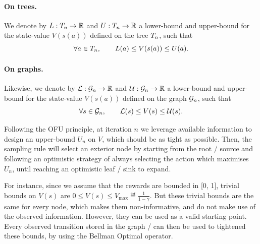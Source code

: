 \documentclass[runningheads]{llncs}
\begin{document}
\begin{definition}
\paragraph{On trees.} We denote by $L:T_n \rightarrow \mathbb{R}$ and  $U:T_n \rightarrow \mathbb{R}$ a lower-bound and upper-bound for the state-value $V(s(a))$ defined on the tree $T_n$, such that
\begin{equation*}
    \forall a\in T_n, \qquad L(a) \leq V(s(a)) \leq U(a).
\end{equation*}

\paragraph{On graphs.} Likewise, we denote by $\mathcal{L}:\mathcal{G}_n \rightarrow \mathbb{R}$ and  $\mathcal{U}:\mathcal{G}_n \rightarrow \mathbb{R}$ a lower-bound and upper-bound for the state-value $V(s(a))$ defined on the graph $\mathcal{G}_n$, such that
\begin{equation*}
\forall s\in\mathcal{G}_n, \qquad \mathcal{L}(s) \leq V(s) \leq \mathcal{U}(s).
\end{equation*}
\end{definition}

Following the OFU principle, at iteration $n$ we leverage available information to design an upper-bound $U_n$ on $V$, which should be as tight as possible. Then, the sampling rule will select an exterior node by starting from the root / source and following an optimistic strategy of always selecting the action which maximises $U_n$, until reaching an optimistic leaf / sink to expand.

For instance, since we assume that the rewards are bounded in [0, 1], trivial bounds on $V(s)$ are
$0 \leq V(s) \leq V_{\max} \eqdef \frac{1}{1-\gamma}$. But these trivial bounds are the same for every node, which makes them non-informative, and do not make use of the observed information. However, they can be used as a valid starting point. Every observed transition stored in the graph / can then be used to tightened these bounds, by using the Bellman Optimal operator.
\end{document}

